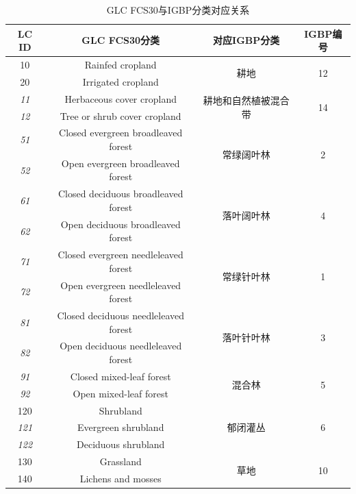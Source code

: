 \begin{table}[htbp]
  \fontsize{9.5}{9.5}\selectfont
  \renewcommand\arraystretch{1.85}
  \centering
  \caption{GLC FCS30与IGBP分类对应关系}
  \label{tab:GLC FCS30与IGBP分类对应关系}
  \begin{tabular}{cccc}
    \toprule
    LC ID & GLC FCS30分类 & 对应IGBP分类 & IGBP编号 \\
%
    \midrule
    10 & Rainfed cropland & \multirow{2}{*}{耕地} & \multirow{2}{*}{12} \\
    20 & Irrigated cropland & & \\
%
    \cline{1-4}  \textit{11} & Herbaceous cover cropland & \multirow{2}{*}{耕地和自然植被混合带} & \multirow{2}{*}{14} \\
    \textit{12} & Tree or shrub cover cropland & & \\
%
    \cline{1-4}  \textit{51} & Closed evergreen broadleaved forest & \multirow{2}{*}{常绿阔叶林} & \multirow{2}{*}{2} \\
    \textit{52} & Open evergreen broadleaved forest & & \\
%
    \cline{1-4}  \textit{61} & Closed deciduous broadleaved forest & \multirow{2}{*}{落叶阔叶林} & \multirow{2}{*}{4} \\
    \textit{62} & Open deciduous broadleaved forest & & \\
%
    \cline{1-4}  \textit{71} & Closed evergreen needleleaved forest & \multirow{2}{*}{常绿针叶林} & \multirow{2}{*}{1} \\
    \textit{72} & Open evergreen needleleaved forest & & \\
%
    \cline{1-4}  \textit{81} & Closed deciduous needleleaved forest & \multirow{2}{*}{落叶针叶林} & \multirow{2}{*}{3} \\
    \textit{82} & Open deciduous needleleaved forest & & \\
%
    \cline{1-4}  \textit{91} & Closed mixed-leaf forest & \multirow{2}{*}{混合林} & \multirow{2}{*}{5} \\
    \textit{92} & Open mixed-leaf forest & & \\
%
    \cline{1-4} 120 & Shrubland & \multirow{3}{*}{郁闭灌丛} & \multirow{3}{*}{6} \\
    \textit{121} & Evergreen shrubland & & \\
    \textit{122} & Deciduous shrubland & & \\
%
    \cline{1-4} 130 & Grassland & \multirow{2}{*}{草地} & \multirow{2}{*}{10} \\
    140 & Lichens and mosses & & \\

\end{tabular}
\end{table}
